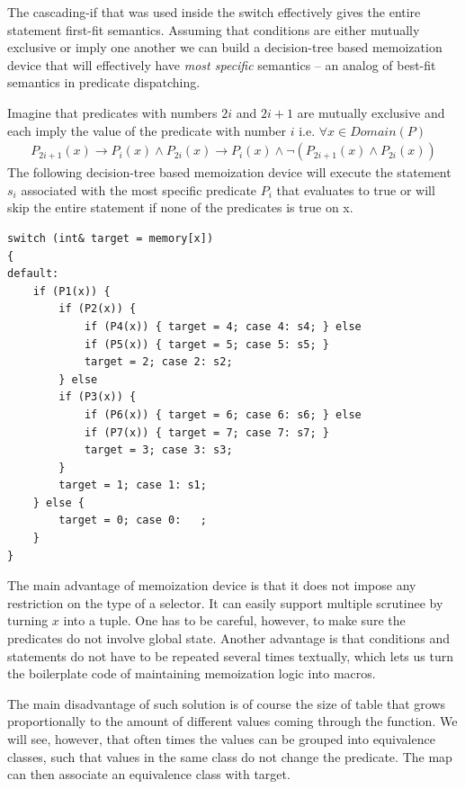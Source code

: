 \documentclass[preprint]{sigplanconf}
\begin{document}
The cascading-if that was used inside the switch effectively gives the entire 
statement first-fit semantics. Assuming that conditions are either mutually 
exclusive or imply one another we can build a decision-tree based memoization 
device that will effectively have \emph{most specific} semantics -- an analog 
of best-fit semantics in predicate dispatching.

Imagine that predicates with numbers $2i$ and $2i+1$ are mutually exclusive and 
each imply the value of the predicate with number $i$ i.e. $\forall x \in Domain(P)$
\begin{eqnarray*}
P_{2i+1}(x)\rightarrow P_i(x) \wedge P_{2i}(x)\rightarrow P_i(x) \wedge \neg(P_{2i+1}(x) \wedge P_{2i}(x))
\end{eqnarray*}
\noindent
The following decision-tree based memoization device will execute the statement 
$s_i$ associated with the most specific predicate $P_i$ that evaluates to true 
or will skip the entire statement if none of the predicates is true on x.

\begin{lstlisting}
switch (int& target = memory[x])
{
default:
    if (P1(x)) {
        if (P2(x)) {
            if (P4(x)) { target = 4; case 4: s4; } else
            if (P5(x)) { target = 5; case 5: s5; } 
            target = 2; case 2: s2;
        } else
        if (P3(x)) {
            if (P6(x)) { target = 6; case 6: s6; } else
            if (P7(x)) { target = 7; case 7: s7; } 
            target = 3; case 3: s3;
        }
        target = 1; case 1: s1;
    } else {
        target = 0; case 0:   ;
    }
}
\end{lstlisting}

The main advantage of memoization device is that it does not impose any 
restriction on the type of a selector. It can easily support multiple scrutinee 
by turning $x$ into a tuple. One has to be careful, however, to make sure the 
predicates do not involve global state. Another advantage is that conditions and 
statements do not have to be repeated several times textually, which lets us 
turn the boilerplate code of maintaining memoization logic into macros.

The main disadvantage of such solution is of course the size of table that grows 
proportionally to the amount of different values coming through the function. We 
will see, however, that often times the values can be grouped into equivalence 
classes, such that values in the same class do not change the predicate. The map 
can then associate an equivalence class with target.
\end{document}
